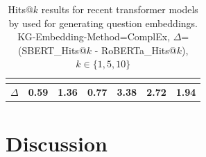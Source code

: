 \begin{table}[]
\begin{tabular}{lrrrrrr}
                                                        & \multicolumn{1}{l}{}                & \multicolumn{1}{l}{}                & \multicolumn{1}{l}{}                & \multicolumn{1}{l}{}                & \multicolumn{1}{l}{}                & \multicolumn{1}{l}{}              \\ \hline
\multicolumn{1}{c|}{$\Delta$}                              & \multicolumn{1}{c|}{\textbf{0.59}}  & \multicolumn{1}{c|}{\textbf{1.36}}  & \multicolumn{1}{c|}{\textbf{0.77}}  & \multicolumn{1}{c|}{\textbf{3.38}}  & \multicolumn{1}{c|}{\textbf{2.72}}  & \multicolumn{1}{c}{\textbf{1.94}} \\ \hline
\end{tabular}
\caption{Hits@$k$ results for recent transformer models by \citep{huggingface-transformers-package-2020} used for generating question embeddings.
KG-Embedding-Method=ComplEx, $\Delta$= (SBERT\_Hits@$k$ - RoBERTa\_Hits@$k$), $k\in\{1,5,10\}$}
\label{webqsp-ablation}
\end{table}

\section{Discussion}\label{sec: discussion}

